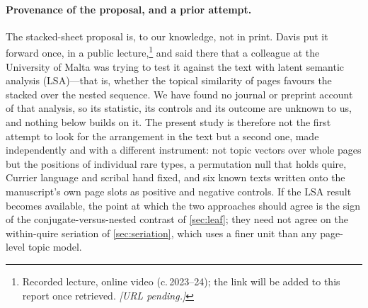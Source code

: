 \documentclass[11pt,a4paper]{article}
\begin{document}
\paragraph{Provenance of the proposal, and a prior attempt.} The stacked-sheet proposal is, to our knowledge, not in print. Davis put it forward once, in a public lecture,\footnote{Recorded lecture, online video (c.\,2023--24); the link will be added to this report once retrieved. \emph{[URL pending.]}} and said there that a colleague at the University of Malta was trying to test it against the text with latent semantic analysis (LSA)---that is, whether the topical similarity of pages favours the stacked over the nested sequence. We have found no journal or preprint account of that analysis, so its statistic, its controls and its outcome are unknown to us, and nothing below builds on it. The present study is therefore not the first attempt to look for the arrangement in the text but a second one, made independently and with a different instrument: not topic vectors over whole pages but the positions of individual rare types, a permutation null that holds quire, Currier language and scribal hand fixed, and six known texts written onto the manuscript's own page slots as positive and negative controls. If the LSA result becomes available, the point at which the two approaches should agree is the sign of the conjugate-versus-nested contrast of \cref{sec:leaf}; they need not agree on the within-quire seriation of \cref{sec:seriation}, which uses a finer unit than any page-level topic model.
\end{document}
